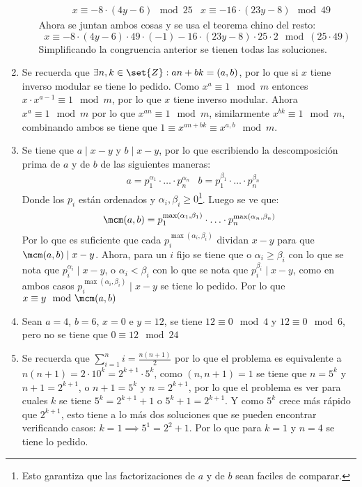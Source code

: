 \documentclass{ayudantia}
\begin{document}
\begin{enumerate}
\begin{enumerate}
        \begin{align*}
            &x\equiv-8\cdot (4y-6)\mod 25 &x\equiv-16\cdot(23y-8)\mod 49
        \end{align*}
        Ahora se juntan ambos cosas y se usa el teorema chino del resto:
        \begin{equation*}
            x\equiv -8\cdot(4y-6)\cdot 49\cdot (-1)-16\cdot(23y-8)\cdot 25\cdot2\mod (25\cdot 49)
        \end{equation*}
        Simplificando la congruencia anterior se tienen todas las soluciones.
    \end{enumerate}
    \item Se recuerda que \(\exists n,k\in\set{Z}: an+bk=(a,b)\), por lo que si \(x\) tiene inverso modular se tiene lo pedido. Como \(x^a\equiv 1\mod m\) entonces \(x\cdot x^{a-1}\equiv 1\mod m\), por lo que \(x\) tiene inverso modular. Ahora \(x^a\equiv 1\mod m\) por lo que \(x^{an}\equiv 1\mod m\), similarmente \(x^{bk}\equiv 1\mod m\), combinando ambos se tiene que \(1\equiv x^{an+bk}\equiv x^{a,b}\mod m\).
    \item Se tiene que \(a\mid x-y\) y \(b\mid x-y\), por lo que escribiendo la descomposición prima de \(a\) y de \(b\) de las siguientes maneras:
    \begin{align*}
        &a=p_1^{\alpha_1}\cdot\ldots\cdot p_n^{\alpha_n} &b=p_1^{\beta_1}\cdot\ldots\cdot p_n^{\beta_n}
    \end{align*}
    Donde los \(p_i\) están ordenados y \(\alpha_i,\beta_i\geq0\)\footnote{Esto garantiza que las factorizaciones de \(a\) y de \(b\) sean faciles de comparar.}. Luego se ve que:
    \begin{equation*}
        \mcm(a,b)=p_1^{\max(\alpha_1,\beta_1)}\cdot\ldots\cdot p_n^{\max(\alpha_n,\beta_n)}
    \end{equation*}
    Por lo que es suficiente que cada \(p_i^{\max(\alpha_i,\beta_i)}\) dividan \(x-y\) para que \(\mcm(a,b)\mid x-y\). Ahora, para un \(i\) fijo se tiene que o \(\alpha_i\geq\beta_i\) con lo que se nota que \(p_i^{\alpha_i}\mid x-y\), o \(\alpha_i<\beta_i\)  con lo que se nota que \(p_i^{\beta_i}\mid x-y\), como en ambos casos \(p_i^{\max(\alpha_i,\beta_i)}\mid x-y\) se tiene lo pedido. Por lo que \(x\equiv y\mod\mcm(a,b)\)
    \item Sean \(a=4\), \(b=6\), \(x=0\) e \(y=12\), se tiene \(12\equiv 0\mod 4\) y \(12\equiv 0\mod 6\), pero no se tiene que \(0\equiv 12\mod 24\)
    \item Se recuerda que \(\sum_{i=1}^ni=\frac{n(n+1)}2\) por lo que el problema es equivalente a \(n(n+1)=2\cdot 10^k=2^{k+1}\cdot 5^k\), como \((n,n+1)=1\) se tiene que \(n=5^k\) y \(n+1=2^{k+1}\), o \(n+1=5^k\) y \(n=2^{k+1}\), por lo que el problema es ver para cuales \(k\) se tiene \(5^k=2^{k+1}+1\) o \(5^k+1=2^{k+1}\). Y como \(5^k\) crece más rápido que \(2^{k+1}\), esto tiene a lo más dos soluciones que se pueden encontrar verificando casos: \(k=1\implies 5^1=2^2+1\). Por lo que para \(k=1\) y \(n=4\) se tiene lo pedido.
\end{enumerate}
\end{document}
